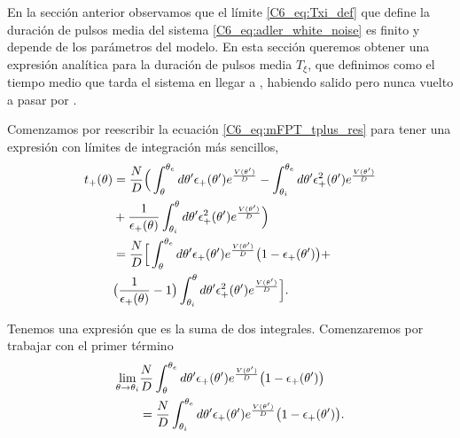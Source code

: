 \documentclass[./main.tex]{subfiles}
\begin{document}
En la sección anterior observamos que el límite \ref{C6_eq:Txi_def} que define la duración de pulsos media del sistema \ref{C6_eq:adler_white_noise} es finito y depende de los parámetros del modelo. En esta sección queremos obtener una expresión analítica para la duración de pulsos media $T_\xi$, que definimos como el tiempo medio que tarda el sistema en llegar a \xxe, habiendo salido pero nunca vuelto a pasar por \xxi.


Comenzamos por reescribir la ecuación \ref{C6_eq:mFPT_tplus_res} para tener una expresión con límites de integración más sencillos,
\begin{align}
     t_{+}(\theta)&= \frac{N}{D} \Big(  \int_\theta^{\theta_e} d \theta' \epsilon_{+}(\theta') e^{ \frac{V(\theta')}{D}} -  \int_{\theta_i}^{\theta_e} d\theta'  \epsilon_{+}^2(\theta') e^{ \frac{V(\theta')}{D}} \nonumber \\ & + \frac{1}{\epsilon_{+}(\theta)} \int_{\theta_i}^{\theta} d\theta'  \epsilon_{+}^2(\theta') e^{ \frac{V(\theta')}{D}} \Big) \\
     &= \frac{N}{D} \Big[  \int_\theta^{\theta_e} d \theta' \epsilon_{+}(\theta') e^{ \frac{V(\theta')}{D}} \big(1 - \epsilon_{+}(\theta') \big)+ \nonumber \\ & \big( \frac{1}{\epsilon_{+}(\theta)} -1 \big) \int_{\theta_i}^{\theta} d\theta'  \epsilon_{+}^2(\theta') e^{ \frac{V(\theta')}{D}} \Big]. \label{C6_eq:Txi_tplus_terminos}
\end{align}

Tenemos una expresión que es la suma de dos integrales. Comenzaremos por trabajar con el primer término 
\begin{align}
     \lim_{\theta \rightarrow   \theta_i }&\frac{N}{D}  \int_\theta^{\theta_e} d \theta' \epsilon_{+}(\theta') e^{ \frac{V(\theta')}{D}} \big(1 - \epsilon_{+}(\theta') \big) \\
     &= \frac{N}{D} \int_{\theta_i}^{\theta_e} d \theta' \epsilon_{+}(\theta') e^{ \frac{V(\theta')}{D}} \big(1 - \epsilon_{+}(\theta') \big).
     \label{C6_eq:Txi_LI1}
\end{align}
\end{document}
